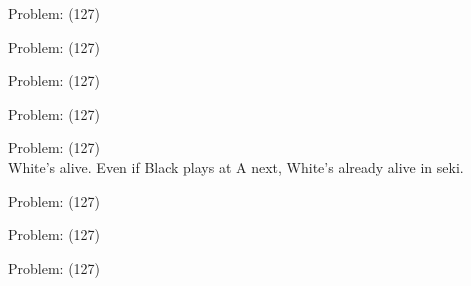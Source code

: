 \documentclass[11pt]{article}
\begin{document}
\begin{minipage}[t]{0.5\textwidth}
  {\centering
  
  Problem: (127)\\
  
  }
\end{minipage}
\begin{minipage}[t]{0.5\textwidth}
  {\centering
  
  Problem: (127)\\
  
  }
\end{minipage}
\begin{minipage}[t]{0.5\textwidth}
  {\centering
  
  Problem: (127)\\
  
  }
\end{minipage}
\begin{minipage}[t]{0.5\textwidth}
  {\centering
  
  Problem: (127)\\
  
  }
\end{minipage}
\begin{minipage}[t]{0.5\textwidth}
  {\centering
  
  Problem: (127)\\
  White's alive. Even if Black plays at A next, White's already alive in seki.\\
  }
\end{minipage}
\begin{minipage}[t]{0.5\textwidth}
  {\centering
  
  Problem: (127)\\
  
  }
\end{minipage}
\begin{minipage}[t]{0.5\textwidth}
  {\centering
  
  Problem: (127)\\
  
  }
\end{minipage}
\begin{minipage}[t]{0.5\textwidth}
  {\centering
  
  Problem: (127)\\
  
  }
\end{minipage}
\end{document}
